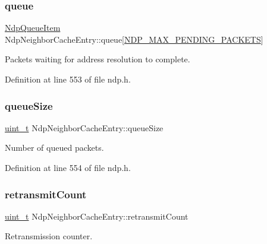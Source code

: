 \subsubsection{\texorpdfstring{queue}{queue}}
{\footnotesize\ttfamily \hyperlink{structNdpQueueItem}{Ndp\+Queue\+Item} Ndp\+Neighbor\+Cache\+Entry\+::queue\mbox{[}\hyperlink{net__config_8h_af20ff817ba73edd4451c0fb8dfb6e5b2}{N\+D\+P\+\_\+\+M\+A\+X\+\_\+\+P\+E\+N\+D\+I\+N\+G\+\_\+\+P\+A\+C\+K\+E\+TS}\mbox{]}}



Packets waiting for address resolution to complete. 



Definition at line 553 of file ndp.\+h.

\mbox{\label{structNdpNeighborCacheEntry_ac6639d88295e91df681f7e0fcb88c83b}} 
\subsubsection{\texorpdfstring{queue\+Size}{queueSize}}
{\footnotesize\ttfamily \hyperlink{compiler__port_8h_a12a1e9b3ce141648783a82445d02b58d}{uint\+\_\+t} Ndp\+Neighbor\+Cache\+Entry\+::queue\+Size}



Number of queued packets. 



Definition at line 554 of file ndp.\+h.

\mbox{\label{structNdpNeighborCacheEntry_a4814680905745d10b71447d63db67a1c}} 
\subsubsection{\texorpdfstring{retransmit\+Count}{retransmitCount}}
{\footnotesize\ttfamily \hyperlink{compiler__port_8h_a12a1e9b3ce141648783a82445d02b58d}{uint\+\_\+t} Ndp\+Neighbor\+Cache\+Entry\+::retransmit\+Count}



Retransmission counter. 



